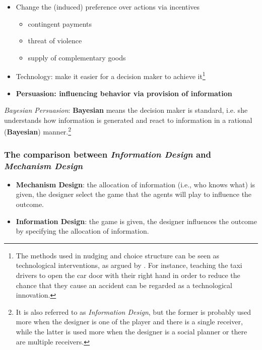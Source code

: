 \documentclass[12pt,letterpaper]{article}
\theoremstyle{definition}   %
\begin{document}
\begin{itemize}
	\item Change the (induced) preference over actions via incentives
	\begin{itemize}
		\item contingent payments
		\item threat of violence
		\item supply of complementary goods
	\end{itemize}
	\item Technology: make it easier for a decision maker to achieve it\footnote{The methods used in nudging and choice structure \citep{thalernudge} can be seen as technological interventions, as argued by \cite{kamenica2012behavioral}. For instance, teaching the taxi drivers to open the car door with their right hand in order to reduce the chance that they cause an accident can be regarded as a technological innovation.}
	\item \textbf{Persuasion: influencing behavior via provision of information \citep{kamenica2011bayesian}}
\end{itemize}

\emph{Bayesian Persuasion}: \textbf{Bayesian} means the decision maker is standard, i.e. she understands how information is generated and react to information in a rational (\textbf{Bayesian}) manner.\footnote{It is also referred to as \emph{Information Design}, but the former is probably used more when the designer is one of the player and there is a single receiver, while the latter is used more when the designer is a social planner or there are multiple receivers.} 

\subsubsection*{The comparison between \emph{Information Design} and \emph{Mechanism Design} \citep*{bergemann2016bayesb, taneva2019information}}

\begin{itemize}
	\item \textbf{Mechanism Design}: the allocation of information (i.e., who knows what) is given, the designer select the game that the agents will play to influence the outcome.
	\item \textbf{Information Design}: the game is given, the designer influences the outcome by specifying the allocation of information. 
\end{itemize}
\end{document}
